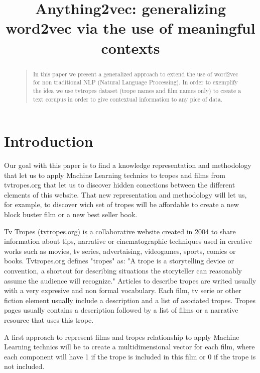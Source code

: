 \documentclass[letterpaper]{article}
\title{Anything2vec: generalizing word2vec via the use of meaningful contexts}
\begin{document}
 
\maketitle
\begin{abstract}
\begin{quote}
In this paper we present a generalized approach to extend the use of word2vec for non traditional NLP (Natural Language Processing). In order to exemplify the idea we use tvtropes dataset (trope names and film names only) to create a text corupus in order to give contextual information to any pice of data.
\end{quote}
\end{abstract}

\section{Introduction}


Our goal with this paper is to find a knowledge representation and methodology that let us to apply Machine Learning technics to tropes and films from tvtropes.org that let us to discover hidden conections between the different elements of this website. That new representation and methodology will let us, for example, to discover wich set of tropes will be affordable to create a new block buster film or a new best seller book.   

Tv Tropes (tvtropes.org) is a collaborative website created in 2004 to share information about tips, narrative or cinematographic techniques used in creative works such as movies, tv series, advertaising, videogames, sports, comics or books. Tvtropes.org defines "tropes" as: "A trope is a storytelling device or convention, a shortcut for describing situations the storyteller can reasonably assume the audience will recognize." Articles to describe tropes are writed usually with a very expresive and non formal vocabulary. Each film, tv serie or other fiction element usually include a description and a list of asociated tropes. Tropes pages usually contains a description followed by a list of films or a narrative resource that uses this trope.   

A first approach to represent films and tropes relationship to apply Machine Learning technics will be to create a multidimensional vector for each film, where each component will have 1 if the trope is included in this film or 0 if the trope is not included.  
\end{document}
